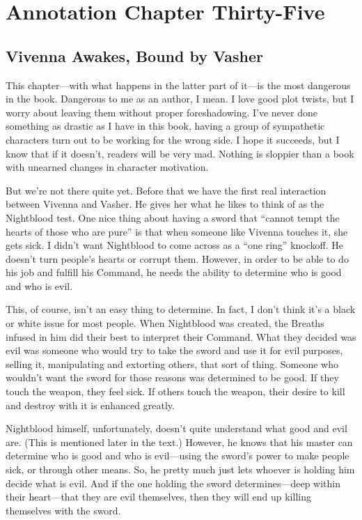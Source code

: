 \section{Annotation Chapter Thirty-Five}

\subsection*{Vivenna Awakes, Bound by Vasher}

This chapter—with what happens in the latter part of it—is the most dangerous in the book. Dangerous to me as an author, I mean. I love good plot twists, but I worry about leaving them without proper foreshadowing. I’ve never done something as drastic as I have in this book, having a group of sympathetic characters turn out to be working for the wrong side. I hope it succeeds, but I know that if it doesn’t, readers will be very mad. Nothing is sloppier than a book with unearned changes in character motivation.

But we’re not there quite yet. Before that we have the first real interaction between Vivenna and Vasher. He gives her what he likes to think of as the Nightblood test. One nice thing about having a sword that “cannot tempt the hearts of those who are pure” is that when someone like Vivenna touches it, she gets sick. I didn’t want Nightblood to come across as a “one ring” knockoff. He doesn’t turn people’s hearts or corrupt them. However, in order to be able to do his job and fulfill his Command, he needs the ability to determine who is good and who is evil.

This, of course, isn’t an easy thing to determine. In fact, I don’t think it’s a black or white issue for most people. When Nightblood was created, the Breaths infused in him did their best to interpret their Command. What they decided was evil was someone who would try to take the sword and use it for evil purposes, selling it, manipulating and extorting others, that sort of thing. Someone who wouldn’t want the sword for those reasons was determined to be good. If they touch the weapon, they feel sick. If others touch the weapon, their desire to kill and destroy with it is enhanced greatly.

Nightblood himself, unfortunately, doesn’t quite understand what good and evil are. (This is mentioned later in the text.) However, he knows that his master can determine who is good and who is evil—using the sword’s power to make people sick, or through other means. So, he pretty much just lets whoever is holding him decide what is evil. And if the one holding the sword determines—deep within their heart—that they are evil themselves, then they will end up killing themselves with the sword.

